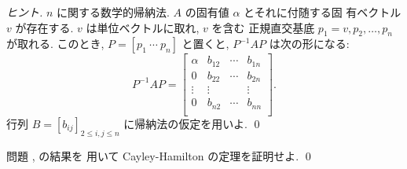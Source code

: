 \documentclass[12pt,twoside]{jarticle}
\begin{document}
\begin{proof}[ヒント]
$n$ に関する数学的帰納法.  $A$ の固有値 $\alpha$ とそれに付随する固
有ベクトル $v$ が存在する. $v$ は単位ベクトルに取れ, $v$ を含む
正規直交基底 $p_1=v,p_2,\dots,p_n$ が取れる.  
このとき, $P=[p_1\ \cdots\ p_n]$ と置くと, $P^{-1}AP$ は次の形になる:
\begin{equation*}
  P^{-1}AP = 
  \begin{bmatrix}
    \alpha & b_{12} & \cdots & b_{1n} \\
       0   & b_{22} & \cdots & b_{2n} \\
    \vdots & \vdots &        & \vdots \\
       0   & b_{n2} & \cdots & b_{nn} \\
  \end{bmatrix}.
\end{equation*}
行列 $B=[b_{ij}]_{2\le i,j\le n}$ に帰納法の仮定を用いよ.
\qed
\end{proof}


\begin{question}[15点]
  問題 ,  の結果を
  用いて Cayley-Hamilton の定理を証明せよ. \qed
\end{question}
\end{document}
